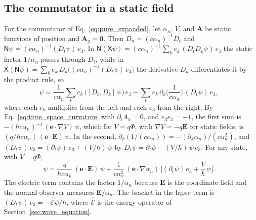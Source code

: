 \documentclass[aps,prd,onecolumn,tightenlines,nofootinbib,notitlepage,11pt,floatfix]{revtex4-2}
\theoremstyle{indentedtheorem}
\begin{document}
\subsection{The commutator in a static field}
\label{sup:static_commutator}

For the commutator of Eq.~\eqref{eq:pure_expanded}, let $\alpha_n$, $V$, and $\mathbf{A}$ be static functions of position and $\mathbf{A}_g=\mathbf{0}$. Then $D_n=(c\alpha_n)^{-1}D_t$ and $\mathsf{N}\psi=(c\alpha_n)^{-1}(D_t\psi) \, e_3$. In $\mathsf{N}(\mathsf{X}\psi)=(c\alpha_n)^{-1}\sum_k e_k \, (D_tD_k\psi) \, e_3$ the static factor $1/\alpha_n$ passes through $D_t$, while in $\mathsf{X}(\mathsf{N}\psi)=\sum_k e_k \, D_k\big((c\alpha_n)^{-1}(D_t\psi) \, e_3\big)$ the derivative $D_k$ differentiates it by the product rule, so
\begin{equation}
    [\mathsf{N},\mathsf{X}] \, \psi = \frac{1}{c\alpha_n} \sum_k e_k \, \big([D_t,D_k] \, \psi\big) \, e_3 - \sum_k e_k \, \partial_k\Big(\frac{1}{c\alpha_n}\Big) \, (D_t\psi) \, e_3 ,
    \label{eq:commutator_static_split}
\end{equation}
where each $e_k$ multiplies from the left and each $e_3$ from the right. By Eq.~\eqref{eq:time_space_curvature} with $\partial_tA_k=0$, and $e_3e_3=-1$, the first sum is $-(\hbar c\alpha_n)^{-1} \, (\mathbf{e}\cdot\nabla V) \, \psi$, which for $V=q\Phi$, with $\nabla V=-q\mathbf{E}$ for static fields, is $(q/\hbar c\alpha_n) \, (\mathbf{e}\cdot\mathbf{E}) \, \psi$. In the second, $\partial_k(1/(c\alpha_n))=-(\partial_k\alpha_n)/(c\alpha_n^2)$, and $(D_t\psi) \, e_3=(\partial_t\psi) \, e_3+(V/\hbar) \, \psi$ by $D_t\psi=\partial_t\psi-(V/\hbar) \, \psi \, e_3$. For any state, with $V=q\Phi$,
\begin{equation}
    [\mathsf{N},\mathsf{X}] \, \psi = \frac{q}{\hbar c\alpha_n} \, (\mathbf{e}\cdot\mathbf{E}) \, \psi + \frac{1}{c\alpha_n^2} \, (\mathbf{e}\cdot\nabla \alpha_n) \, \Big[(\partial_t\psi) \, e_3 + \frac{V}{\hbar} \, \psi\Big] .
    \label{eq:commutator_general}
\end{equation}
The electric term contains the factor $1/\alpha_n$ because $\mathbf{E}$ is the coordinate field and the normal observer measures $\mathbf{E}/\alpha_n$. The bracket in the lapse term is $(D_t\psi)\,e_3=-\hat{\mathcal{E}}\psi/\hbar$, where $\hat{\mathcal{E}}$ is the energy operator of Section~\ref{sec:wave_equation}.
\end{document}
